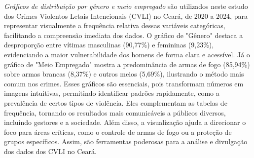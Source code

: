 \documentclass{exam}
\begin{document}
\begin{questions}
\begin{table}[H]
    \centering
    \caption{Tabela Cruzada: Escolaridade da Vítima vs. Raça da Vítima}
    \label{tab:cruzada_escolaridade_raca}
\end{table}

\question 
\textit{Gráficos de distribuição por gênero e meio empregado} são utilizados neste estudo dos Crimes Violentos Letais Intencionais (CVLI) no Ceará, de 2020 a 2024, para representar visualmente a frequência relativa dessas variáveis categóricas, facilitando a compreensão imediata dos dados. O gráfico de "Gênero" destaca a desproporção entre vítimas masculinas (90,77\%) e femininas (9,23\%), evidenciando a maior vulnerabilidade dos homens de forma clara e acessível. Já o gráfico de "Meio Empregado" mostra a predominância de armas de fogo (85,94\%) sobre armas brancas (8,37\%) e outros meios (5,69\%), ilustrando o método mais comum nos crimes. Esses gráficos são essenciais, pois transformam números em imagens intuitivas, permitindo identificar padrões rapidamente, como a prevalência de certos tipos de violência. Eles complementam as tabelas de frequência, tornando os resultados mais comunicáveis a públicos diversos, incluindo gestores e a sociedade. Além disso, a visualização ajuda a direcionar o foco para áreas críticas, como o controle de armas de fogo ou a proteção de grupos específicos. Assim, são ferramentas poderosas para a análise e divulgação dos dados dos CVLI no Ceará.


\end{questions}
\end{document}
